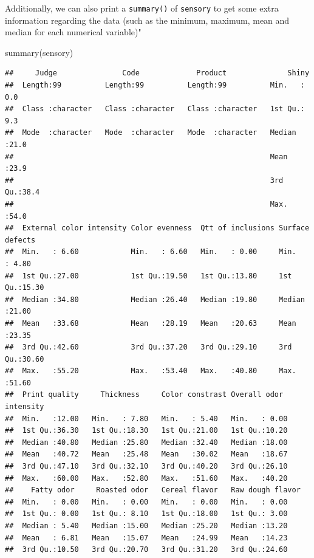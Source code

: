 \documentclass[
]{book}
\newenvironment{Shaded}{\begin{snugshade}}{\end{snugshade}}
\newcommand{\FunctionTok}[1]{\textcolor[rgb]{0.00,0.00,0.00}{#1}}
\newcommand{\NormalTok}[1]{#1}
\begin{document}
Additionally, we can also print a \texttt{summary()} of \texttt{sensory} to get some extra information regarding the data (such as the minimum, maximum, mean and median for each numerical variable)"

\begin{Shaded}
\begin{Highlighting}[]
\FunctionTok{summary}\NormalTok{(sensory)}
\end{Highlighting}
\end{Shaded}

\begin{verbatim}
##     Judge               Code             Product              Shiny     
##  Length:99          Length:99          Length:99          Min.   : 0.0  
##  Class :character   Class :character   Class :character   1st Qu.: 9.3  
##  Mode  :character   Mode  :character   Mode  :character   Median :21.0  
##                                                           Mean   :23.9  
##                                                           3rd Qu.:38.4  
##                                                           Max.   :54.0  
##  External color intensity Color evenness  Qtt of inclusions Surface defects
##  Min.   : 6.60            Min.   : 6.60   Min.   : 0.00     Min.   : 4.80  
##  1st Qu.:27.00            1st Qu.:19.50   1st Qu.:13.80     1st Qu.:15.30  
##  Median :34.80            Median :26.40   Median :19.80     Median :21.00  
##  Mean   :33.68            Mean   :28.19   Mean   :20.63     Mean   :23.35  
##  3rd Qu.:42.60            3rd Qu.:37.20   3rd Qu.:29.10     3rd Qu.:30.60  
##  Max.   :55.20            Max.   :53.40   Max.   :40.80     Max.   :51.60  
##  Print quality     Thickness     Color constrast Overall odor intensity
##  Min.   :12.00   Min.   : 7.80   Min.   : 5.40   Min.   : 0.00         
##  1st Qu.:36.30   1st Qu.:18.30   1st Qu.:21.00   1st Qu.:10.20         
##  Median :40.80   Median :25.80   Median :32.40   Median :18.00         
##  Mean   :40.72   Mean   :25.48   Mean   :30.02   Mean   :18.67         
##  3rd Qu.:47.10   3rd Qu.:32.10   3rd Qu.:40.20   3rd Qu.:26.10         
##  Max.   :60.00   Max.   :52.80   Max.   :51.60   Max.   :40.20         
##    Fatty odor     Roasted odor   Cereal flavor   Raw dough flavor
##  Min.   : 0.00   Min.   : 0.00   Min.   : 0.00   Min.   : 0.00   
##  1st Qu.: 0.00   1st Qu.: 8.10   1st Qu.:18.00   1st Qu.: 3.00   
##  Median : 5.40   Median :15.00   Median :25.20   Median :13.20   
##  Mean   : 6.81   Mean   :15.07   Mean   :24.99   Mean   :14.23   
##  3rd Qu.:10.50   3rd Qu.:20.70   3rd Qu.:31.20   3rd Qu.:24.60   

\end{verbatim}
\end{document}
